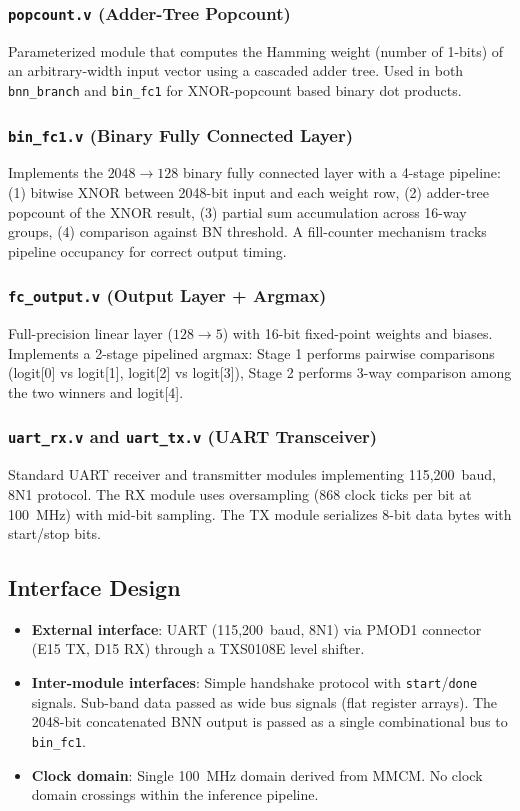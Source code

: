 \documentclass[conference]{IEEEtran}
\begin{document}
\subsubsection{\texttt{popcount.v} (Adder-Tree Popcount)}
Parameterized module that computes the Hamming weight (number of 1-bits) of an arbitrary-width input vector using a cascaded adder tree. Used in both \texttt{bnn\_branch} and \texttt{bin\_fc1} for XNOR-popcount based binary dot products.

\subsubsection{\texttt{bin\_fc1.v} (Binary Fully Connected Layer)}
Implements the $2048 \rightarrow 128$ binary fully connected layer with a 4-stage pipeline: (1) bitwise XNOR between 2048-bit input and each weight row, (2) adder-tree popcount of the XNOR result, (3) partial sum accumulation across 16-way groups, (4) comparison against BN threshold. A fill-counter mechanism tracks pipeline occupancy for correct output timing.

\subsubsection{\texttt{fc\_output.v} (Output Layer + Argmax)}
Full-precision linear layer ($128 \rightarrow 5$) with 16-bit fixed-point weights and biases. Implements a 2-stage pipelined argmax: Stage 1 performs pairwise comparisons (logit[0] vs logit[1], logit[2] vs logit[3]), Stage 2 performs 3-way comparison among the two winners and logit[4].

\subsubsection{\texttt{uart\_rx.v} and \texttt{uart\_tx.v} (UART Transceiver)}
Standard UART receiver and transmitter modules implementing 115,200~baud, 8N1 protocol. The RX module uses oversampling (868 clock ticks per bit at 100~MHz) with mid-bit sampling. The TX module serializes 8-bit data bytes with start/stop bits.

\subsection{Interface Design}

\begin{itemize}
    \item \textbf{External interface}: UART (115,200~baud, 8N1) via PMOD1 connector (E15 TX, D15 RX) through a TXS0108E level shifter.
    \item \textbf{Inter-module interfaces}: Simple handshake protocol with \texttt{start}/\texttt{done} signals. Sub-band data passed as wide bus signals (flat register arrays). The 2048-bit concatenated BNN output is passed as a single combinational bus to \texttt{bin\_fc1}.
    \item \textbf{Clock domain}: Single 100~MHz domain derived from MMCM. No clock domain crossings within the inference pipeline.
\end{itemize}
\end{document}

